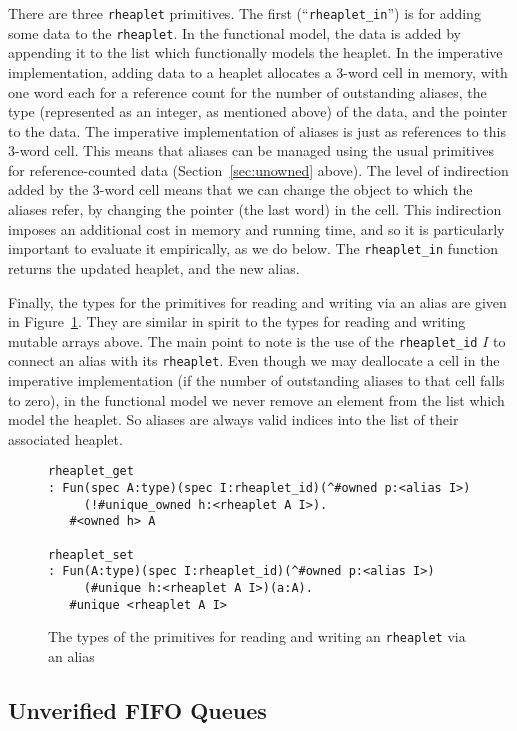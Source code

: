 \documentclass[9pt,natbib]{sigplanconf}
\begin{document}
There are three \texttt{rheaplet} primitives.  The first
(``\texttt{rheaplet\_in}'') is for adding some data to the
\texttt{rheaplet}.  In the functional model, the data is added by
appending it to the list which functionally models the heaplet.  In
the imperative implementation, adding data to a heaplet allocates a
3-word cell in memory, with one word each for a reference count for
the number of outstanding aliases, the type (represented as an
integer, as mentioned above) of the data, and the pointer to the data.
The imperative implementation of aliases is just as references to this
3-word cell.  This means that aliases can be managed using the usual
primitives for reference-counted data (Section~\ref{sec:unowned}
above).  The level of indirection added by the 3-word cell means that
we can change the object to which the aliases refer, by changing the
pointer (the last word) in the cell.  This indirection imposes an
additional cost in memory and running time, and so it is particularly
important to evaluate it empirically, as we do below.  The
\texttt{rheaplet\_in} function returns the updated heaplet, and the
new alias.

Finally, the types for the primitives for reading and writing via an
alias are given in Figure~\ref{fig:rheaplet}.  They are similar in
spirit to the types for reading and writing mutable arrays above.  The
main point to note is the use of the \texttt{rheaplet\_id} $I$ to
connect an alias with its \texttt{rheaplet}.  Even though we may
deallocate a cell in the imperative implementation (if the number of
outstanding aliases to that cell falls to zero), in the functional
model we never remove an element from the list which model the
heaplet.  So aliases are always valid indices into the list of their
associated heaplet.

\begin{figure}
\small
\begin{verbatim}
rheaplet_get
: Fun(spec A:type)(spec I:rheaplet_id)(^#owned p:<alias I>)
     (!#unique_owned h:<rheaplet A I>).
   #<owned h> A

rheaplet_set
: Fun(A:type)(spec I:rheaplet_id)(^#owned p:<alias I>)
     (#unique h:<rheaplet A I>)(a:A).
   #unique <rheaplet A I>
\end{verbatim}
\caption{The types of the primitives for reading and writing an \texttt{rheaplet} via an alias}
\label{fig:rheaplet}
\end{figure}

\subsection{Unverified FIFO Queues}
\end{document}
